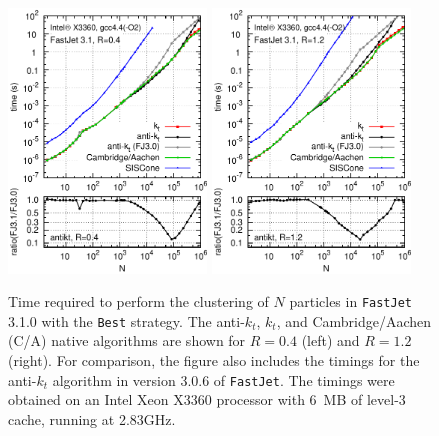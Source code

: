 \documentclass[12pt,a4]{article}
\newcommand{\fastjet}{\texttt{FastJet}\xspace}
\newcommand{\ttt}[1]{{\small\texttt{#1}}}
\begin{document}
\begin{figure}[tp]
  \centering
  \includegraphics[width=0.47\textwidth]{figs/fj31_timings_best_R04}\hfill
  \includegraphics[width=0.47\textwidth]{figs/fj31_timings_best_R12}
  \caption{
    Time required to perform the clustering of $N$ particles in
    \fastjet 3.1.0 with the \ttt{Best} strategy. The anti-$k_t$,
    $k_t$, and Cambridge/Aachen (C/A) native algorithms are shown for
    $R=0.4$ (left) and $R=1.2$ (right).
    For comparison, the figure also includes the timings for the anti-$k_t$ algorithm
    in version 3.0.6 of \fastjet.
    The timings were obtained on an Intel Xeon X3360 processor with 6~MB of
    level-3 cache, running at 2.83GHz.
}
\end{figure}
\end{document}
